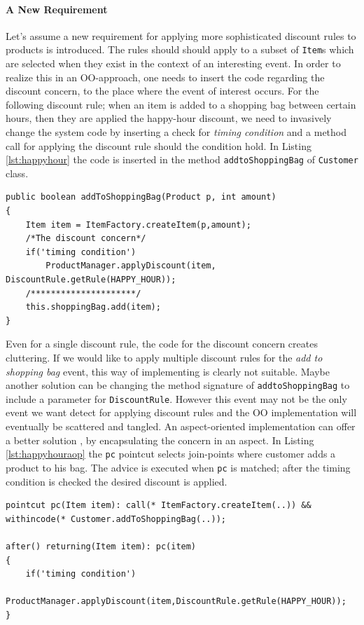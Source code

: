 \documentclass{llncs}
\begin{document}
\paragraph{A New Requirement}
Let's assume a new requirement for applying more sophisticated discount rules to products is introduced. The rules should should apply to a subset of \texttt{Item}s which are selected when they exist in the context of an interesting event. In order to realize this in an OO-approach, one needs to insert the code regarding the discount concern, to the place where the event of interest occurs. For the following discount rule; \textsf{when an item is added to a shopping bag between certain hours, then they are applied the happy-hour discount}, we need to invasively change the system code by inserting a check for \emph{timing condition} and a method call for applying the discount rule should the condition hold. In Listing \ref{lst:happyhour} the code is inserted in the method \texttt{addtoShoppingBag} of \texttt{Customer} class.

\begin{lstlisting}[caption={A Java implementation of Happy-hour discount rule}, label={lst:happyhour}]
public boolean addToShoppingBag(Product p, int amount)
{
	Item item = ItemFactory.createItem(p,amount);
	/*The discount concern*/
	if('timing condition')
		ProductManager.applyDiscount(item, DiscountRule.getRule(HAPPY_HOUR));
	/*********************/
	this.shoppingBag.add(item);
}
\end{lstlisting}

Even for a single discount rule, the code for the discount concern creates cluttering. If we would like to apply multiple discount rules for the \emph{add to shopping bag} event, this way of implementing is clearly not suitable. Maybe another solution can be changing the method signature of \texttt{addtoShoppingBag} to include a parameter for \texttt{DiscountRule}. However this event may not be the only event we want detect for applying discount rules and the OO implementation will eventually be scattered and tangled. An aspect-oriented implementation can offer a better solution , by encapsulating the concern in an aspect. In Listing \ref{lst:happyhouraop} the \texttt{pc} pointcut selects join-points where customer adds a product to his bag. The advice is executed when \texttt{pc} is matched; after the timing condition is checked the desired discount is applied.

\begin{lstlisting}[caption={An Aspectj implementation of Happy-hour discount rule}, label={lst:happyhouraop}]
pointcut pc(Item item): call(* ItemFactory.createItem(..)) && withincode(* Customer.addToShoppingBag(..));

after() returning(Item item): pc(item)
{
	if('timing condition')
		ProductManager.applyDiscount(item,DiscountRule.getRule(HAPPY_HOUR));
}
\end{lstlisting}
\end{document}
